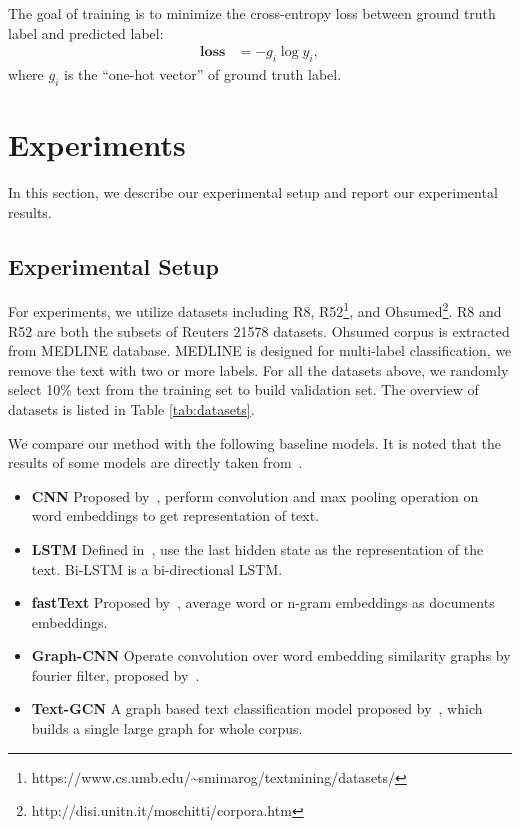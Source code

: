 \documentclass[11pt,a4paper]{article}
\begin{document}
The goal of training is to minimize the cross-entropy loss between ground truth label and predicted label:
\begin{align}
    \mathbf{loss} &= -g_i\log y_i,
\end{align}
where $g_i$ is the ``one-hot vector'' of ground truth label.

\section{Experiments}\label{sec:exp_setup}
In this section, we describe our experimental setup and report our experimental results.
\subsection{Experimental Setup}



For experiments, we utilize datasets including R8, R52\footnote{https://www.cs.umb.edu/\~{}smimarog/textmining/datasets/}, and  Ohsumed\footnote{http://disi.unitn.it/moschitti/corpora.htm}.
R8 and R52 are both the subsets of Reuters 21578 datasets. Ohsumed corpus is extracted from MEDLINE database. MEDLINE is designed for multi-label classification, we remove the text with two or more labels. For all the datasets above, we randomly select 10\% text from the training set to build validation set.  The overview of datasets is listed in Table \ref{tab:datasets}.

We compare our method with the following baseline models. 
It is noted that the results of some models are directly taken from~\cite{yao2018graph}.

\begin{itemize}
     \item \textbf{CNN} Proposed by~\cite{kim2014convolutional}, perform convolution and max pooling operation on word embeddings to get representation of text. 
     
     \item \textbf{LSTM} Defined in~\cite{liu2016recurrent}, use the last hidden state as the representation of the text. Bi-LSTM is a bi-directional LSTM.
     
     \item \textbf{fastText} Proposed by~\cite{joulin2016bag}, average word or n-gram embeddings as documents embeddings.
     
    \item \textbf{Graph-CNN} Operate convolution over word embedding similarity graphs by fourier filter, proposed by~\cite{defferrard2016convolutional}.
    
    \item \textbf{Text-GCN} A graph based text classification model proposed by~\cite{yao2018graph}, which builds a single large graph for whole corpus.
\end{itemize}
\end{document}
